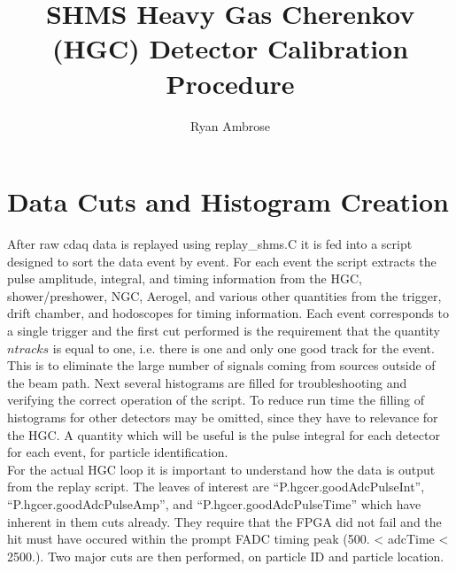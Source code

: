\documentclass[12pt,a4paper]{article}
\begin{document}
\title{SHMS Heavy Gas Cherenkov (HGC) Detector Calibration Procedure}
\author{Ryan Ambrose}

\maketitle

\section{Data Cuts and Histogram Creation}

After raw cdaq data is replayed using replay\_shms.C it is fed into a script designed to sort the data event by event. For each event the script extracts the pulse amplitude, integral, and timing information from the HGC, shower/preshower, NGC, Aerogel, and various other quantities from the trigger, drift chamber, and hodoscopes for timing information. Each event corresponds to a single trigger and the first cut performed is the requirement that the quantity $ntracks$ is equal to one, i.e. there is one and only one good track for the event. This is to eliminate the large number of signals coming from sources outside of the beam path. Next several histograms are filled for troubleshooting and verifying the correct operation of the script. To reduce run time the filling of histograms for other detectors may be omitted, since they have to relevance for the HGC. A quantity which will be useful is the pulse integral for each detector for each event, for particle identification. \\

For the actual HGC loop it is important to understand how the data is output from the replay script. The leaves of interest are ``P.hgcer.goodAdcPulseInt'', ``P.hgcer.goodAdcPulseAmp'', and ``P.hgcer.goodAdcPulseTime'' which have inherent in them cuts already. They require that the FPGA did not fail and the hit must have occured within the prompt FADC timing peak (500. < adcTime < 2500.). Two major cuts are then performed, on particle ID and particle location. 
\end{document}
